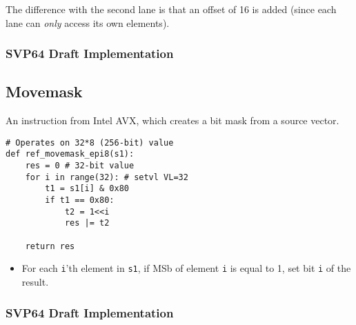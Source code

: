 The difference with the second lane is that an offset of 16 is added (since
each lane can \textit{only} access its own elements).

\subsubsection{SVP64 Draft Implementation}

\subsection{Movemask}

An instruction from Intel AVX, which creates a bit mask from a source vector.

\begin{verbatim}
# Operates on 32*8 (256-bit) value
def ref_movemask_epi8(s1):
    res = 0 # 32-bit value
    for i in range(32): # setvl VL=32
        t1 = s1[i] & 0x80
        if t1 == 0x80:
            t2 = 1<<i
            res |= t2

    return res
\end{verbatim}

\begin{itemize}
  \item For each \texttt{i}'th element in \texttt{s1}, if \acrshort{MSb} of
        element \texttt{i} is equal to 1, set bit \texttt{i} of the result.
\end{itemize}

\subsubsection{SVP64 Draft Implementation}
